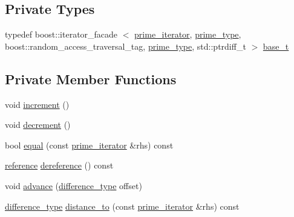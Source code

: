 \subsection*{\-Private \-Types}
\begin{DoxyCompactItemize}
\item 
typedef boost\-::iterator\-\_\-facade\*
$<$ \hyperlink{classyuh_1_1range__detail_1_1prime__iterator}{prime\-\_\-iterator}, \hyperlink{namespaceyuh_af542f8440602da42322ddb7ea8242336}{prime\-\_\-type}, \*
boost\-::random\-\_\-access\-\_\-traversal\-\_\-tag, \*
\hyperlink{namespaceyuh_af542f8440602da42322ddb7ea8242336}{prime\-\_\-type}, std\-::ptrdiff\-\_\-t $>$ \hyperlink{classyuh_1_1range__detail_1_1prime__iterator_af6bf48039295b29ac1f86bd776f4a29a}{base\-\_\-t}
\end{DoxyCompactItemize}
\subsection*{\-Private \-Member \-Functions}
\begin{DoxyCompactItemize}
\item 
void \hyperlink{classyuh_1_1range__detail_1_1prime__iterator_aeb2624c7a86b765725fd80cd426e147d}{increment} ()
\item 
void \hyperlink{classyuh_1_1range__detail_1_1prime__iterator_af998f1201f6ff5160003144e5818b8ba}{decrement} ()
\item 
bool \hyperlink{classyuh_1_1range__detail_1_1prime__iterator_ad971c0d6ccb1edb1b7753d099376cc67}{equal} (const \hyperlink{classyuh_1_1range__detail_1_1prime__iterator}{prime\-\_\-iterator} \&rhs) const 
\item 
\hyperlink{classyuh_1_1range__detail_1_1prime__iterator_aa5d67140d1557795cc6c30a2849d4e05}{reference} \hyperlink{classyuh_1_1range__detail_1_1prime__iterator_a41a5655b05004c0e8e527af93d08d2a3}{dereference} () const 
\item 
void \hyperlink{classyuh_1_1range__detail_1_1prime__iterator_a0b477ad04db9bc38c85d68245b9886e5}{advance} (\hyperlink{classyuh_1_1range__detail_1_1prime__iterator_a9ac6039762e1b262cecb98589ffc1d75}{difference\-\_\-type} offset)
\item 
\hyperlink{classyuh_1_1range__detail_1_1prime__iterator_a9ac6039762e1b262cecb98589ffc1d75}{difference\-\_\-type} \hyperlink{classyuh_1_1range__detail_1_1prime__iterator_a4510fc76b72f1340fb6cf787d3eafe72}{distance\-\_\-to} (const \hyperlink{classyuh_1_1range__detail_1_1prime__iterator}{prime\-\_\-iterator} \&rhs) const 
\end{DoxyCompactItemize}
